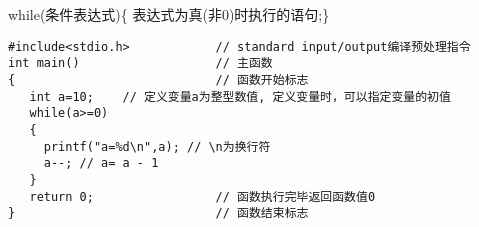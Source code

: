 \begin{frame}[fragile]{while(条件表达式)\{ 表达式为真(非0)时执行的语句;\}}
\begin{lstlisting}
#include<stdio.h>            // standard input/output编译预处理指令
int main()                   // 主函数
{                            // 函数开始标志
   int a=10;    // 定义变量a为整型数值, 定义变量时，可以指定变量的初值
   while(a>=0)
   {
     printf("a=%d\n",a); // \n为换行符
     a--; // a= a - 1
   }
   return 0;                 // 函数执行完毕返回函数值0
}                            // 函数结束标志
\end{lstlisting}
\end{frame}




